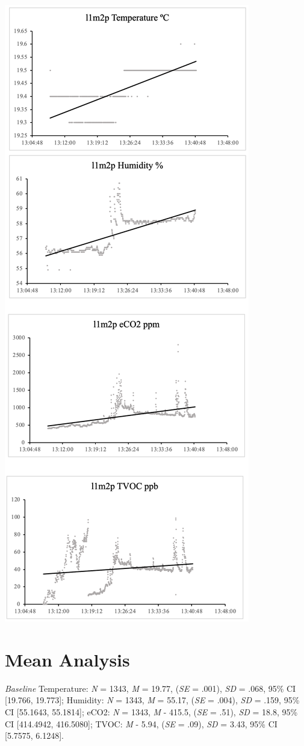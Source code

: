 \documentclass{ueacmpstyle}
\begin{document}
            \includegraphics[scale=0.3]{Images/l1m2p.png}
        \newpage
        \section{Mean Analysis}\label{means}
        \textit{Baseline} Temperature: \textit{N} = 1343, \textit{M} = 19.77, (\textit{SE} = .001), \textit{SD} = .068, 95\% CI [19.766, 19.773]; Humidity: \textit{N} = 1343, \textit{M} = 55.17, (\textit{SE} = .004), \textit{SD} = .159, 95\% CI [55.1643, 55.1814]; eCO2: \textit{N} = 1343, \textit{M} - 415.5, (\textit{SE} = .51), \textit{SD} = 18.8, 95\% CI [414.4942, 416.5080]; TVOC: \textit{M} - 5.94, (\textit{SE} = .09), \textit{SD} = 3.43, 95\% CI [5.7575, 6.1248]. 
        
\end{document}
